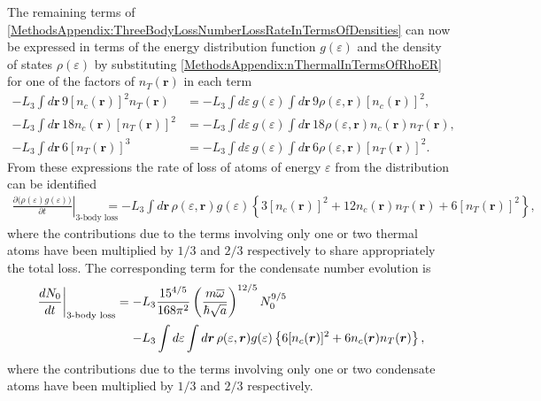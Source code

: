 The remaining terms of \eqref{MethodsAppendix:ThreeBodyLossNumberLossRateInTermsOfDensities} can now be expressed in terms of the energy distribution function $g(\varepsilon)$ and the density of states $\rho(\varepsilon)$ by substituting \eqref{MethodsAppendix:nThermalInTermsOfRhoER} for one of the factors of $n_T(\bm{r})$ in each term
\begin{align}
    -L_3 \int d \bm{r}\, 9 [n_c(\bm{r})]^2 n_T(\bm{r}) &= - L_3 \int d\varepsilon\, g(\varepsilon) \int d \bm{r}\, 9 \rho(\varepsilon, \bm{r}) [n_c(\bm{r})]^2, \label{MethodsAppendix:Condensate2Thermal1}\\
    -L_3 \int d \bm{r}\, 18 n_c(\bm{r}) [n_T(\bm{r})]^2 &= - L_3 \int d\varepsilon\, g(\varepsilon) \int d \bm{r}\, 18 \rho(\varepsilon, \bm{r}) n_c(\bm{r}) n_T(\bm{r}), \label{MethodsAppendix:Condensate1Thermal2}\\
    -L_3 \int d \bm{r}\, 6 [n_T(\bm{r})]^3 &= - L_3 \int d\varepsilon\, g(\varepsilon) \int d \bm{r}\, 6 \rho(\varepsilon, \bm{r}) [n_T(\bm{r})]^2. \label{MethodsAppendix:Condensate0Thermal3}
\end{align}
From these expressions the rate of loss of atoms of energy $\varepsilon$ from the distribution can be identified
\begin{align}
    \left.\frac{\partial\big(\rho(\varepsilon) g(\varepsilon)\big)}{\partial t}\right|_\text{3-body loss} &= -L_3 \int d \bm{r}\, \rho(\varepsilon, \bm{r}) g(\varepsilon) \left\{ 3 [n_c(\bm{r})]^2 + 12 n_c(\bm{r}) n_T(\bm{r}) + 6 [n_T(\bm{r})]^2 \right\},
    \label{MethodsAppendix:QKT3BodyLossDistributionEvolution}
\end{align}
where the contributions due to the terms involving only one or two thermal atoms have been multiplied by $1/3$ and $2/3$ respectively to share appropriately the total loss.  The corresponding term for the condensate number evolution is
\begin{align}
    \begin{split}
        \left. \frac{d N_0}{dt} \right|_\text{3-body loss} &= - L_3 \frac{15^{4/5}}{168 \pi^2} \left(\frac{m \overline{\omega}}{\hbar \sqrt{a}} \right)^{12/5} N_0^{9/5}\\
        &\relphantom{=} - L_3 \int d\varepsilon \int d \bm{r}\, \rho(\varepsilon, \bm{r}) g(\varepsilon) \left\{6 [n_c(\bm{r})]^2 + 6 n_c(\bm{r}) n_T(\bm{r}) \right\},
    \end{split}
    \label{MethodsAppendix:QKT3BodyLossCondensateEvolution}
\end{align}
where the contributions due to the terms involving only one or two condensate atoms have been multiplied by $1/3$ and $2/3$ respectively.

